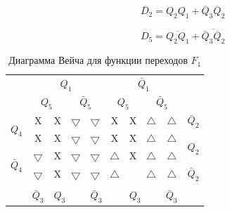 \documentclass[a4paper,14pt]{article}
\begin{document}
$$\overline{D}_2 = Q_2Q_1 + \overline{Q}_3\overline{Q}_2$$

$$D_5 = \overline{Q_2Q_1} + \overline{\overline{Q}_3\overline{Q}_2}$$


\begin{table}[H]
	\begin{center}
		\caption{\label{tab:F1_tab} Диаграмма Вейча для функции переходов $F_1$ }
		\begin{tabular}{cccccccccc}
			& \multicolumn{4}{c}{$Q_1$} & \multicolumn{4}{c}{$\bar{Q}_1$} &  \\
			& \multicolumn{2}{c}{$Q_5$} & \multicolumn{2}{c}{$\bar{Q}_5$} & \multicolumn{2}{c}{$Q_5$} & \multicolumn{2}{c}{$\bar{Q}_5$} &  \\ \cline{2-9}
			\multicolumn{1}{c|}{\multirow{2}{*}{$Q_4$}} & \multicolumn{1}{c|}{X} & \multicolumn{1}{c|}{X} & \multicolumn{1}{c|}{$\bigtriangledown$} & \multicolumn{1}{c|}{$\bigtriangledown$} & \multicolumn{1}{c|}{X} & \multicolumn{1}{c|}{X} & \multicolumn{1}{c|}{$\bigtriangleup$} & \multicolumn{1}{c|}{$\bigtriangleup$} & $\bar{Q}_2$ \\ \cline{2-9}
			\multicolumn{1}{c|}{} & \multicolumn{1}{c|}{X} & \multicolumn{1}{c|}{X} & \multicolumn{1}{c|}{$\bigtriangledown$} & \multicolumn{1}{c|}{$\bigtriangledown$} & \multicolumn{1}{c|}{X} & \multicolumn{1}{c|}{X} & \multicolumn{1}{c|}{$\bigtriangleup$} & \multicolumn{1}{c|}{$\bigtriangleup$} & \multirow{2}{*}{$Q_2$} \\ \cline{2-9}
			\multicolumn{1}{c|}{\multirow{2}{*}{$\bar{Q}_4$}} & \multicolumn{1}{c|}{$\bigtriangledown$} & \multicolumn{1}{c|}{X} & \multicolumn{1}{c|}{$\bigtriangledown$} & \multicolumn{1}{c|}{$\bigtriangledown$} & \multicolumn{1}{c|}{$\bigtriangleup$} & \multicolumn{1}{c|}{X} & \multicolumn{1}{c|}{$\bigtriangleup$} & \multicolumn{1}{c|}{$\bigtriangleup$} &  \\ \cline{2-9}
			\multicolumn{1}{c|}{} & \multicolumn{1}{c|}{$\bigtriangledown$} & \multicolumn{1}{c|}{X} & \multicolumn{1}{c|}{$\bigtriangledown$} & \multicolumn{1}{c|}{$\bigtriangledown$} & \multicolumn{1}{c|}{$\bigtriangleup$} & \multicolumn{1}{c|}{} & \multicolumn{1}{c|}{$\bigtriangleup$} & \multicolumn{1}{c|}{$\bigtriangleup$} & $\bar{Q}_2$ \\ \cline{2-9}
			&  & \multicolumn{2}{c}{} & \multicolumn{2}{c}{} & \multicolumn{2}{c}{} &  &  \\
			\multicolumn{1}{l}{} & \multicolumn{1}{l}{$\bar{Q}_3$} & \multicolumn{2}{l}{$Q_3$} & \multicolumn{2}{l}{$\bar{Q}_3$} & \multicolumn{2}{l}{$Q_3$} & \multicolumn{1}{l}{$\bar{Q}_3$} & \multicolumn{1}{l}{}
		\end{tabular}
	\end{center}
\end{table}
\end{document}
